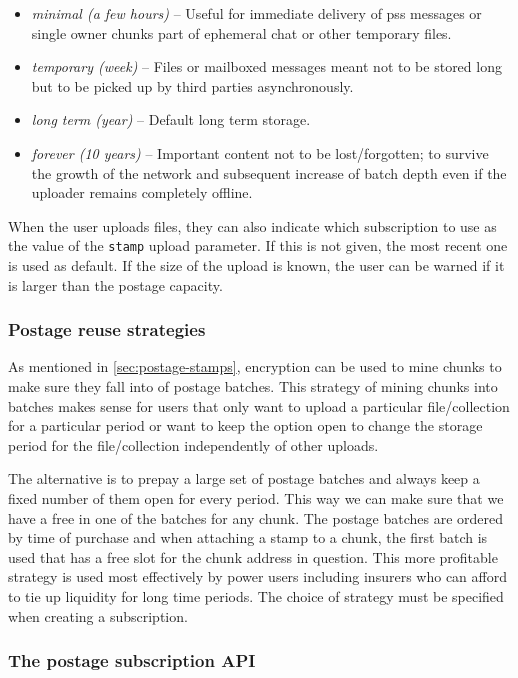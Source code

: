 \begin{itemize}[noitemsep]
\item \emph{minimal (a few hours)} -- Useful for immediate delivery of pss messages or single owner chunks part of ephemeral chat or other temporary files.
\item \emph{temporary (week)} -- Files or mailboxed messages meant not to be stored long but to be picked up by third parties asynchronously.
\item \emph{long term (year)} -- Default long term storage. 
\item \emph{forever (10 years)} -- Important content not to be lost/forgotten; to survive the growth of the network and subsequent increase of batch depth even if the uploader remains completely offline.
\end{itemize}

When the user uploads files, they can also indicate which subscription to use as the value of the \lstinline{stamp} upload parameter. If this is not given, the most recent one is used as default. If the size of the upload is known, the user can be warned if it is larger than the postage capacity. 

\subsubsection{Postage reuse strategies}

As mentioned in \ref{sec:postage-stamps}, encryption can be used to mine chunks to make sure they fall into  of postage batches. This strategy of mining chunks into batches makes sense for users that only want to upload a particular file/collection for a particular period or want to keep the option open to change the storage period for the file/collection independently of other uploads.

The alternative is to prepay a large set of postage batches and always keep a fixed number of them open for every period. This way we can make sure that we have a free  in one of the batches for any chunk. The postage batches are ordered by time of purchase and when attaching a stamp to a chunk, the first batch is used that has a free slot for the chunk address in question. This more profitable strategy is used most effectively by power users including insurers who can afford to tie up liquidity for long time periods. The choice of strategy must be specified when creating a subscription.

\subsubsection{The postage subscription API}

